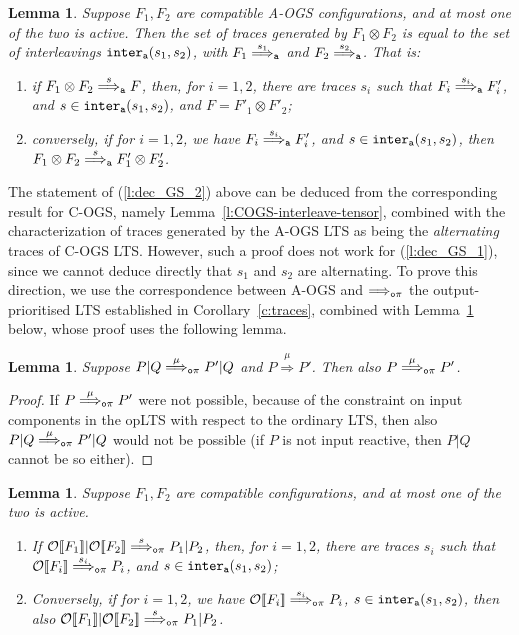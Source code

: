 \documentclass[11pt,a4paper]{amsart}
\theoremstyle{plain}
\theoremstyle{definition}
\theoremstyle{defC}
\theoremstyle{thmC}
\theoremstyle{plain}
\numberwithin{equation}{section}
\newcommand{\tr}{s}
\newcommand{\AOGS}{\mbox{{\rm A-OGS}}\xspace}      %
\newcommand{\COGS}{\mbox{{\rm C-OGS}}\xspace}      %
\newcommand{\appendCon}[2]{#1 \otimes #2}
\newcommand{\rmm}[1]{{\tt{\lowercase{#1}}}}
\newcommand{\genArr}[2]{\mathrel{\stackrel{{#1}}{\Longrightarrow}_{\rmm{\lowercase{#2}}}}}  %
\newcommand{\ArrA}[1]{\genArr{#1}{A}}  %
\newcommand{\ArrN}[1]{\genArr{#1}{o\pi}}  %
\newcommand{\Arr}[1]{\mathrel{\stackrel{{#1}}{\Longrightarrow}}}  %
\newcommand{\outputpr}{output-prioritised\xspace}  %
\newcommand{\opLTS}{opLTS\xspace}  %
\newcommand{\interlA}[2]{{\tt inter_{a}}( #1, #2)}
\newcommand{\FF}{F}
\newcommand{\encoEnvV}[1]{{\mathcal {O}} [\! [ #1 ] \! ]  } %
\newcommand{\encoConV}{\encoEnvV} %
\theoremstyle{plain}
\newtheorem{lemma}[thm]{Lemma}
\theoremstyle{definition}
\begin{document}
\begin{lemma}
\label{c:dec_GS}
Suppose $\FF_1,\FF_2$ are compatible \AOGS configurations, and at most one of the two is active.
Then the set of traces generated by $\FF_1 \otimes \FF_2$
is equal to the set of interleavings $\interlA{\tr_1}{\tr_2}$,
with $\FF_1 \ArrA{\tr_1}$ and $\FF_2 \ArrA{\tr_2}$.
That is:
\begin{enumerate}
  \item\label{l:dec_GS_1} if $\appendCon{\FF_1}{\FF_2} \ArrA{\tr} \FF$, 
  then, for $i=1,2$,  there are traces $ \tr_i$
  such that $ {\FF_i} \ArrA{\tr_i} \FF'_i$, 
  and $\tr  \in \interlA{ \tr_1}{\tr_2}$, 
  and $\FF = \appendCon{\FF'_1}{\FF'_2}$;
  \item\label{l:dec_GS_2} conversely, if for $i=1,2$, we have
  $\FF_i \ArrA{ \tr_i} \FF'_i$,  
  and $\tr  \in \interlA {\tr_1}{\tr_2}$, 
  then $\appendCon{\FF_1}{\FF_2} \ArrA{\tr} 
  \appendCon{\FF'_1} {\FF'_2}$.
\end{enumerate}
\end{lemma}  
\noindent
The statement of (\ref{l:dec_GS_2}) above can be deduced from
the corresponding result for \COGS, namely
Lemma~\ref{l:COGS-interleave-tensor},
combined with the characterization
of traces generated by the \AOGS LTS 
as being the \emph{alternating} traces of \COGS LTS.
However, such a proof does not work for (\ref{l:dec_GS_1}),
since we cannot deduce directly that $\tr_1$ and $\tr_2$ are alternating.
To prove this direction,
we use the correspondence between \AOGS and $\ArrN{}$ the \outputpr LTS 
established in Corollary~\ref{c:traces}, 
combined with Lemma~\ref{l:dec_piI} below, whose proof uses  the following lemma.


\begin{lemma}
\label{l:dec_piI_aux}
Suppose $P| Q  \ArrN \mu P'|Q$ and 
$P  \Arr \mu P'$. Then also $P  \ArrN \mu P'$.
\end{lemma} 
\begin{proof}
If $P  \ArrN \mu P'$ were not possible, because of the constraint on input components in
the \opLTS with respect to the ordinary LTS, then also 
$P| Q  \ArrN \mu P'|Q$ would not be possible (if $P$ is not input reactive,  then 
$P|Q$ cannot be so either). 
\end{proof} 


\begin{lemma}
\label{l:dec_piI}
Suppose $\FF_1,\FF_2$ are compatible configurations, and at most one of the two is active.
\begin{enumerate}
\item If $\encoConV {\FF_1} |\encoConV {\FF_2} \ArrN \tr  P_1 | P_2  $, 
  then, for $i=1,2$,  there are traces $ \tr_i $
  such that $\encoConV {\FF_i} \ArrN { \tr_i} P_i $, 
  and $ \tr \in \interlA { \tr_1   }{ \tr_2 }$;
\item
Conversely, if for  $i=1,2$, we have
  $\encoConV {\FF_i} \ArrN { \tr_i} P_i$,
  $\tr \in \interlA { \tr_1   }{ \tr_2 }$, 
  then also 
  $\encoConV {\FF_1} |\encoConV {\FF_2} \ArrN \tr  P_1 | P_2$.
\end{enumerate} 
\end{lemma}  
\end{document}

